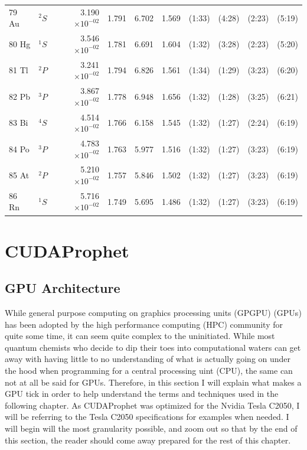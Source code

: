 \documentclass[12pt]{report}
\begin{document}
\begin{longtable}{l l r r r r r r r r}
79 Au & $^{2}S$ & 3.190$\times10^{-02}$ & 1.791 & 6.702 & 1.569 & (1:33) & (4:28) & (2:23) & (5:19) \\
80 Hg & $^{1}S$ & 3.546$\times10^{-02}$ & 1.781 & 6.691 & 1.604 & (1:32) & (3:28) & (2:23) & (5:20) \\
81 Tl & $^{2}P$ & 3.241$\times10^{-02}$ & 1.794 & 6.826 & 1.561 & (1:34) & (1:29) & (3:23) & (6:20) \\
82 Pb & $^{3}P$ & 3.867$\times10^{-02}$ & 1.778 & 6.948 & 1.656 & (1:32) & (1:28) & (3:25) & (6:21) \\
83 Bi & $^{4}S$ & 4.514$\times10^{-02}$ & 1.766 & 6.158 & 1.545 & (1:32) & (1:27) & (2:24) & (6:19) \\
84 Po & $^{3}P$ & 4.783$\times10^{-02}$ & 1.763 & 5.977 & 1.516 & (1:32) & (1:27) & (3:23) & (6:19) \\
85 At & $^{2}P$ & 5.210$\times10^{-02}$ & 1.757 & 5.846 & 1.502 & (1:32) & (1:27) & (3:23) & (6:19) \\
86 Rn & $^{1}S$ & 5.716$\times10^{-02}$ & 1.749 & 5.695 & 1.486 & (1:32) & (1:27) & (3:23) & (6:19) \\
\bottomrule
\end{longtable}


\chapter{CUDAProphet}
\section{GPU Architecture}
While general purpose computing on graphics processing units (GPGPU) (GPUs) has been adopted by the high performance computing (HPC) community for quite some time, it can seem quite complex to the uninitiated. While most quantum chemists who decide to dip their toes into computational waters can get away with having little to no understanding of what is actually going on under the hood when programming for a central processing uint (CPU), the same can not at all be said for GPUs. Therefore, in this section I will explain what makes a GPU tick in order to help understand the terms and techniques used in the following chapter. As CUDAProphet was optimized for the Nvidia Tesla C2050, I will be referring to the Tesla C2050 specifications for examples when needed. I will begin will the most granularity possible, and zoom out so that by the end of this section, the reader should come away prepared for the rest of this chapter.
\end{document}
